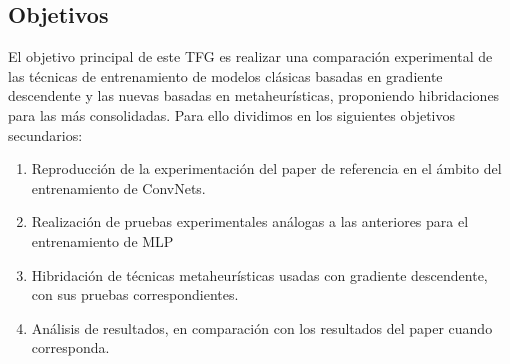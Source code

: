 \subsection{Objetivos}

El objetivo principal de este TFG es realizar una comparación experimental de las técnicas de entrenamiento de modelos clásicas basadas en gradiente descendente y las nuevas basadas en metaheurísticas, proponiendo hibridaciones para las más consolidadas. Para ello dividimos en los siguientes objetivos secundarios:


\begin{enumerate}

\item Reproducción de la experimentación del paper de referencia en el ámbito del entrenamiento de ConvNets.

\item Realización de pruebas experimentales análogas a las anteriores para el entrenamiento de MLP

\item Hibridación de técnicas metaheurísticas usadas con gradiente descendente, con sus pruebas correspondientes.

\item Análisis de resultados, en comparación con los resultados del paper cuando corresponda.

\end{enumerate}
